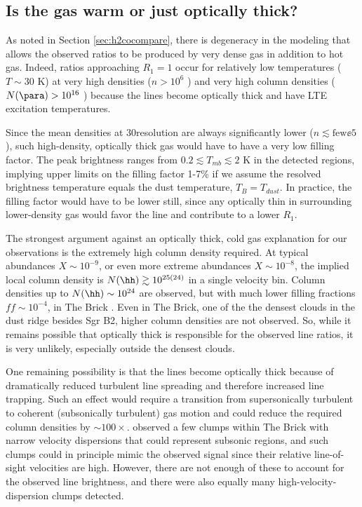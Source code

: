 \subsection{Is the gas warm or just optically thick?}
\label{sec:thickorwarm}
As noted in Section \ref{sec:h2cocompare}, there is degeneracy in the modeling
that allows the observed ratios to be produced by very dense gas in addition to
hot gas.  Indeed, ratios approaching $R_1=1$ occur for relatively low
temperatures ($T\sim30$ K) at very high densities ($n>10^{6}$ \percc)
and very high column densities ($N(\para)>10^{16}$ \perkms \persc) because
the lines become optically thick and have LTE excitation temperatures.

Since the mean densities at 30\arcsec resolution are always significantly lower
($n\lesssim\mathrm{few}\ee{5}$ \percc), such high-density,
optically thick gas would have to have a very low filling factor.  The peak
\para \threeohthree brightness ranges from $0.2 \lesssim T_{mb} \lesssim 2$ K
in the detected regions, implying upper limits on the filling factor 1-7\% if
we assume the resolved brightness temperature equals the dust temperature,
$T_B=T_{dust}$.
In practice, the filling factor would have to be lower still, since any
optically thin \para in surrounding lower-density gas would favor the
\threeohthree line and contribute to a lower $R_1$.

The strongest argument against an optically thick, cold gas explanation for our
observations is the extremely high column
density required.  At typical \para abundances $X\sim10^{-9}$, or even more
extreme abundances $X\sim10^{-8}$, the implied local column density is
$N(\hh)\gtrsim10^{25(24)}$ \persc in a single velocity bin.  Column densities
up to $N(\hh)\sim10^{24}$ \persc are observed, but with much lower filling
fractions $ff\sim10^{-4}$, in The Brick \citep[][their Figure
4]{Rathborne2014b}.  Even in The Brick, one of the the densest clouds in the
dust ridge besides Sgr B2, higher column densities are not observed.  So, while
it remains possible that optically thick
\para is responsible for the observed line ratios, it is very unlikely,
especially outside the densest clouds.

One remaining possibility is that the \para lines become optically thick
because of dramatically reduced turbulent line spreading and therefore
increased line trapping.  Such an effect would require a transition from
supersonically turbulent to coherent (subsonically turbulent) gas motion
\citep[e.g.][]{Pineda2010a} and could reduce the required column densities by
$\sim100\times$.   \citet{Kauffmann2013a} observed a few clumps within The
Brick with narrow velocity dispersions that could represent subsonic regions,
and such clumps could in principle mimic the observed signal since their
relative line-of-sight velocities are high.  However, there are not enough of
these to account for the observed line brightness, and there were also equally
many high-velocity-dispersion clumps detected. 

